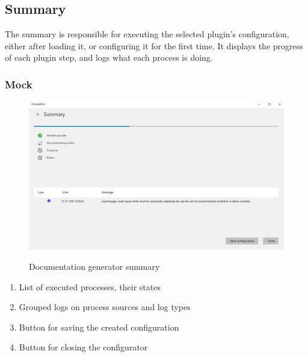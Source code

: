 \subsection{Summary}

The summary is responsible for executing the selected plugin's configuration, either after loading it, or configuring it for the first time. It displays the progress of each plugin step, and logs what each process is doing.

\subsubsection{Mock}

\begin{figure}[H]
    \includegraphics[width=\linewidth]{img/mockSummary.png}
    \label{fig:summaryPage}
    \caption{Documentation generator summary}
\end{figure}

\begin{enumerate}
    \item List of executed processes, their states
    \item Grouped logs on process sources and log types
    \item Button for saving the created configuration
    \item Button for closing the configurator
\end{enumerate}
